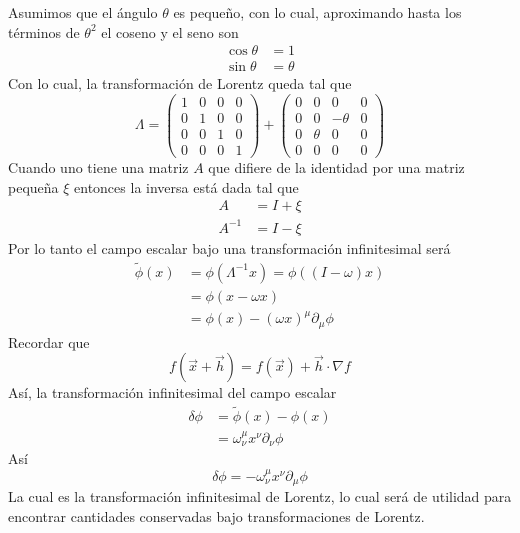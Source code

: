 \documentclass[../main.tex]{subfiles}
\begin{document}
Asumimos que el ángulo $\theta$ es pequeño, con lo cual, aproximando hasta los términos de $\theta^2$ el coseno y el seno son
\begin{align*}
  \cos{\theta} & = 1 \\
  \sin{\theta} & = \theta
\end{align*}
Con lo cual, la transformación de Lorentz queda tal que
\begin{equation*}
  \Lambda = \begin{pmatrix}
    1 & 0 & 0 & 0 \\
    0 & 1 & 0 & 0 \\
    0 & 0 & 1 & 0 \\
    0 & 0 & 0 & 1
  \end{pmatrix} + 
  \begin{pmatrix}
    0 & 0 & 0 & 0 \\
    0 & 0 & -\theta & 0\\
    0 & \theta & 0 & 0 \\
    0 & 0 & 0 & 0 
  \end{pmatrix}
\end{equation*}
Cuando uno tiene una matriz $A$ que difiere de la identidad por una matriz pequeña $\xi$ entonces la inversa está dada tal que
\begin{align*}
  A & = I + \xi \\
  A^{-1} & = I - \xi 
\end{align*}
Por lo tanto el campo escalar bajo una transformación infinitesimal será
\begin{align*}
  \tilde{\phi}(x)  & = \phi(\Lambda^{-1}x) = \phi((I-\omega)x) \\
  & = \phi(x-\omega x) \\
  & = \phi(x) - (\omega x)^\mu \partial_\mu \phi
\end{align*}
Recordar que
\begin{equation}
  f(\vec{x}+\vec{h}) = f(\vec{x}) + \vec{h}\cdot \nabla f
\end{equation}
Así, la transformación infinitesimal del campo escalar
\begin{align*}
  \delta \phi & = \tilde{\phi}(x) - \phi(x) \\
  & = \omega^\mu_\nu x^\nu \partial_\nu \phi
\end{align*}
Así
\begin{equation}
  \boxed{  \delta \phi = -\omega^\mu_\nu x^\nu \partial_\mu \phi }
\end{equation}
La cual es la transformación infinitesimal de Lorentz, lo cual será de utilidad para encontrar cantidades conservadas bajo transformaciones de Lorentz.
\end{document}
